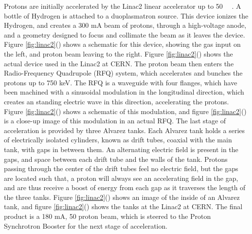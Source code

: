 \par Protons are initially accelerated by the Linac2 linear accelerator
up to 50
\MeV~\cite{LHC:TDR_Vol3_InjectionChain_Benedikt}~\cite{LHC:LHIC_linac2_lhcTests_Hill}.
A bottle of Hydrogen is attached to a duoplasmatron source.  This
device ionizes the Hydrogen, and creates a 300 mA beam of protons,
through a high-voltage anode, and a geometry designed to focus and
collimate the beam as it leaves the device.  Figure
\ref{fig:linac2}() shows a
schematic for this device, showing the gas input on the left, and
proton beam leaving to the right.  Figure
\ref{fig:linac2}() shows the actual
device used in the Linac2 at CERN.  The proton beam then enters the
Radio-Frequency Quadrupole (RFQ) system, which accelerates and bunches
the protons up to 750 keV.  The RFQ is a waveguide with four flanges,
which have been machined with a sinusoidal modulation in the
longitudinal direction, which creates an standing electric wave in
this direction, accelerating the protons.  Figure
\ref{fig:linac2}() shows a schematic of this
modulation, and figure \ref{fig:linac2}() is a
close-up image of this modulation in an actual RFQ. The last stage of
acceleration is provided by three Alvarez tanks.  Each Alvarez tank
holds a series of electrically isolated cylinders, known as drift
tubes, coaxial with the main tank, with gaps in between them. An
alternating electric field is present in the gaps, and space between
each drift tube and the walls of the tank.  Protons passing through
the center of the drift tubes feel no electric field, but the gaps are
located such that, a proton will always see an accelerating field in
the gap, and are thus receive a boost of energy from each gap as it
traverses the length of the three tanks.  Figure
\ref{fig:linac2}() shows an image of
the inside of an Alvarez tank, and figure
\ref{fig:linac2}() shows the tanks at
the Linac2 at CERN.  The final product is a 180 mA, 50 \MeV proton
beam, which is steered to the Proton Synchrotron Booster for the next
stage of acceleration.

